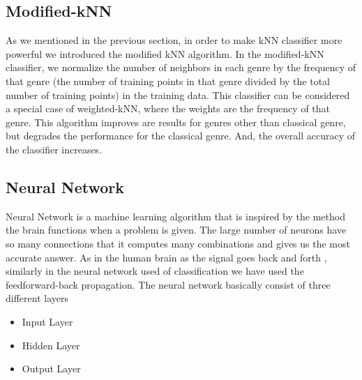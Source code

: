 \documentclass[12pt]{article}
\begin{document}
\subsection{Modified-kNN}
As we mentioned in the previous section, in order to make kNN classifier more powerful we introduced the modified kNN algorithm. In the modified-kNN classifier, we normalize the number of neighbors in each genre by the frequency of that genre (the number of training points in that genre divided by the total number of training points) in the training data. This classifier can be considered a special case of weighted-kNN, where the weights are the frequency of that genre. This algorithm improves are results for genres other than classical genre, but degrades the performance for the classical genre. And, the overall accuracy of the classifier increases.

\subsection{Neural Network}
Neural Network is a machine learning algorithm that is inspired by the method the brain functions when a problem is given. The large number of neurons have so many connections that it computes many combinations and gives us the most accurate answer.
As in the human brain as the signal goes back and forth , similarly in the neural network used of classification we have used the feedforward-back propagation.
The neural network basically consist of three different layers
\begin{itemize}
  \item Input Layer
  \item Hidden Layer
   \item Output Layer
\end{itemize}
\end{document}
